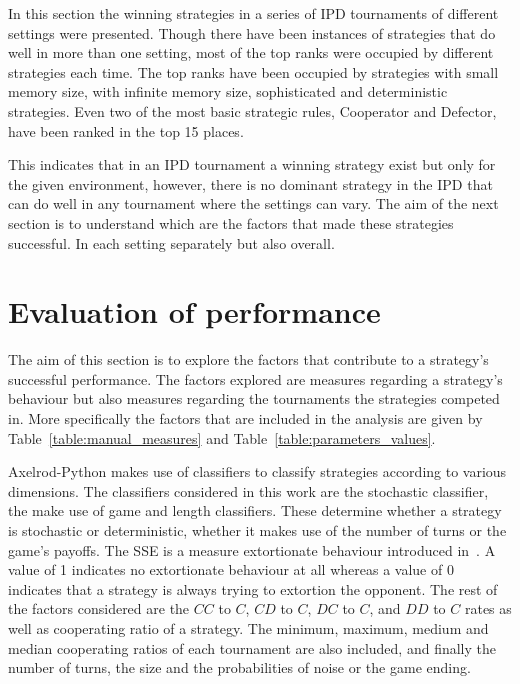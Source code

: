\documentclass{article}
\begin{document}
In this section the winning strategies in a series of IPD tournaments of
different settings were presented. Though there have been instances of
strategies that do well in more than one setting, most of the top ranks were
occupied by different strategies each time. The top ranks have been occupied
by strategies with small memory size, with infinite memory size, sophisticated
and deterministic strategies. Even two of the most basic strategic rules,
Cooperator and Defector, have been ranked in the top 15 places.

This indicates that in an IPD tournament a winning strategy exist but only for
the given environment, however, there is no dominant strategy in the IPD that
can do well in any tournament where the settings can vary. The aim of the next
section is to understand which are the factors that made these strategies
successful. In each setting separately but also overall.

\section{Evaluation of performance}\label{section:evaluation_of_performance}

The aim of this section is to explore the factors that contribute to a
strategy's successful performance. The factors explored are measures regarding a
strategy's behaviour but also measures regarding the tournaments the strategies
competed in. More specifically the factors that are included in the analysis are
given by Table~\ref{table:manual_measures} and
Table~\ref{table:parameters_values}.

Axelrod-Python makes use of classifiers to classify strategies according to
various dimensions. The classifiers considered in this work are the stochastic
classifier, the make use of game and length classifiers. These determine whether
a strategy is stochastic or deterministic, whether it makes use of the number of
turns or the game's payoffs. The SSE is a measure extortionate
behaviour introduced in~\cite{Knight2019}. A value of 1 indicates no
extortionate behaviour at all whereas a value of 0 indicates that a strategy is
always trying to extortion the opponent. The rest of the factors considered
are the $CC$ to $C$, $CD$ to $C$, $DC$ to $C$, and $DD$ to $C$ rates as well as
cooperating ratio of a strategy. The minimum, maximum, medium and median
cooperating ratios of each tournament are also included, and finally the number of
turns, the size and the probabilities of noise or the game ending.
\end{document}
